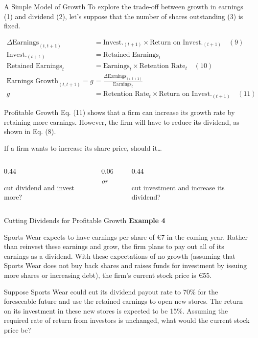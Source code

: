 \documentclass[9pt,aspectratio=169]{beamer}
\newcommand{\keypoint}[1]{%
  \par\noindent
  \begingroup
  \usebeamercolor{keypoint}%
  \setlength{\fboxsep}{7pt}%
  \colorbox{bg}{\parbox{\dimexpr\linewidth-2\fboxsep\relax}{\color{fg}#1}}%
  \endgroup
  \par\medskip}
\begin{document}
\begin{frame}{A Simple Model of Growth}
To explore the trade-off between growth in earnings (1) and dividend (2), let's suppose
that the number of shares outstanding (3) is fixed.

\begin{align}\nonumber
\Delta\text{Earnings}_{(t,t+1)} &= \text{Invest.}_{(t+1)} \times \text{Return on Invest.}_{(t+1)} \quad (9) \\\nonumber
\text{Invest.}_{(t+1)} &= \text{Retained Earnings}_t \\\nonumber
\text{Retained Earnings}_t &= \text{Earnings}_t \times \text{Retention Rate}_t \quad (10) \\\nonumber
\text{Earnings Growth}_{(t,t+1)} =g &= \frac{\Delta\text{Earnings}_{(t,t+1)}}{\text{Earnings}_t} \\\nonumber
g &= \text{Retention Rate}_t \times \text{Return on Invest.}_{(t+1)} \quad (11)
\end{align}
\end{frame}

\begin{frame}{Profitable Growth}
Eq. (11) shows that a firm can increase its growth rate by retaining more earnings.
However, the firm will have to reduce its dividend, as shown in Eq. (8).

\vspace{1em}
If a firm wants to increase its share price, should it\ldots

\vspace{0.6em}
\begin{columns}[c]
\begin{column}{0.44\textwidth}
\keypoint{\centering cut dividend and invest more?}
\end{column}
\begin{column}{0.06\textwidth}
\centering\textit{or}
\end{column}
\begin{column}{0.44\textwidth}
\keypoint{\centering cut investment and increase its dividend?}
\end{column}
\end{columns}
\end{frame}


\begin{frame}{Cutting Dividends for Profitable Growth}
\textbf{Example 4}

Sports Wear expects to have earnings per share of €7 in the coming year. Rather than reinvest these earnings and grow, the firm plans to pay out all of its earnings as a dividend. With these expectations of no growth (assuming that Sports Wear does not buy back shares and raises funds for investment by issuing more shares or increasing debt), the firm's current stock price is €55.

Suppose Sports Wear could cut its dividend payout rate to 70\% for the foreseeable future and use the retained earnings to open new stores. The return on its investment in these new stores is expected to be 15\%. Assuming the required rate of return from investors is unchanged, what would the current stock price be?

\end{frame}
\end{document}
